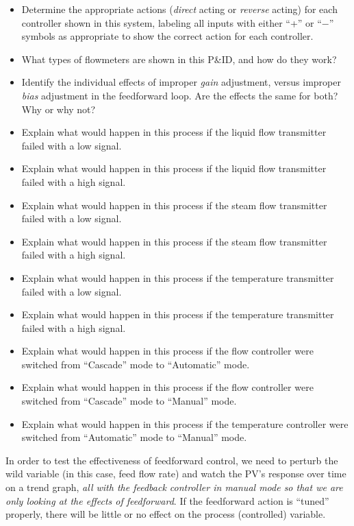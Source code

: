 \begin{itemize}
\item{} Determine the appropriate actions ({\it direct} acting or {\it reverse} acting) for each controller shown in this system, labeling all inputs with either ``+'' or ``$-$'' symbols as appropriate to show the correct action for each controller.
\item{} What types of flowmeters are shown in this P\&ID, and how do they work?
\item{} Identify the individual effects of improper {\it gain} adjustment, versus improper {\it bias} adjustment in the feedforward loop.  Are the effects the same for both?  Why or why not?
\item{} Explain what would happen in this process if the liquid flow transmitter failed with a low signal.
\item{} Explain what would happen in this process if the liquid flow transmitter failed with a high signal.
\item{} Explain what would happen in this process if the steam flow transmitter failed with a low signal.
\item{} Explain what would happen in this process if the steam flow transmitter failed with a high signal.
\item{} Explain what would happen in this process if the temperature transmitter failed with a low signal.
\item{} Explain what would happen in this process if the temperature transmitter failed with a high signal.
\item{} Explain what would happen in this process if the flow controller were switched from ``Cascade'' mode to ``Automatic'' mode.
\item{} Explain what would happen in this process if the flow controller were switched from ``Cascade'' mode to ``Manual'' mode.
\item{} Explain what would happen in this process if the temperature controller were switched from ``Automatic'' mode to ``Manual'' mode.
\end{itemize}







In order to test the effectiveness of feedforward control, we need to perturb the wild variable (in this case, feed flow rate) and watch the PV's response over time on a trend graph, {\it all with the feedback controller in manual mode so that we are only looking at the effects of feedforward}.  If the feedforward action is ``tuned'' properly, there will be little or no effect on the process (controlled) variable.

